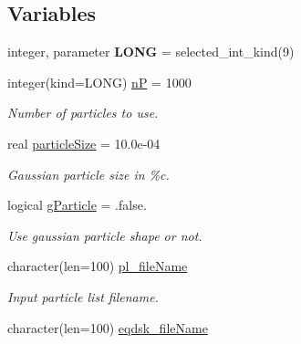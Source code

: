 \subsection*{Variables}
\begin{CompactItemize}
\item 
\hypertarget{namespaceread__namelist_27d7daada32b7b99599cf00e25db306a}{
integer, parameter \textbf{LONG} = selected\_\-int\_\-kind(9)}
\label{namespaceread__namelist_27d7daada32b7b99599cf00e25db306a}

\item 
\hypertarget{namespaceread__namelist_547b2176c8609085ef49086c6a21d2ec}{
integer(kind=LONG) \hyperlink{namespaceread__namelist_547b2176c8609085ef49086c6a21d2ec}{nP} = 1000}
\label{namespaceread__namelist_547b2176c8609085ef49086c6a21d2ec}

\begin{CompactList}\small\item\em Number of particles to use. \item\end{CompactList}\item 
\hypertarget{namespaceread__namelist_51479be8474c6d291af2a46b8331aaea}{
real \hyperlink{namespaceread__namelist_51479be8474c6d291af2a46b8331aaea}{particleSize} = 10.0e-04}
\label{namespaceread__namelist_51479be8474c6d291af2a46b8331aaea}

\begin{CompactList}\small\item\em Gaussian particle size in \%c. \item\end{CompactList}\item 
\hypertarget{namespaceread__namelist_b9e1c6830267da5645449b24067d0027}{
logical \hyperlink{namespaceread__namelist_b9e1c6830267da5645449b24067d0027}{gParticle} = .false.}
\label{namespaceread__namelist_b9e1c6830267da5645449b24067d0027}

\begin{CompactList}\small\item\em Use gaussian particle shape or not. \item\end{CompactList}\item 
\hypertarget{namespaceread__namelist_d419f56fadc9ca0868e70587f88a388f}{
character(len=100) \hyperlink{namespaceread__namelist_d419f56fadc9ca0868e70587f88a388f}{pl\_\-fileName}}
\label{namespaceread__namelist_d419f56fadc9ca0868e70587f88a388f}

\begin{CompactList}\small\item\em Input particle list filename. \item\end{CompactList}\item 
\hypertarget{namespaceread__namelist_fd515ec3f58c51427343e97ef1ee4eab}{
character(len=100) \hyperlink{namespaceread__namelist_fd515ec3f58c51427343e97ef1ee4eab}{eqdsk\_\-fileName}}
\label{namespaceread__namelist_fd515ec3f58c51427343e97ef1ee4eab}


\end{CompactItemize}
